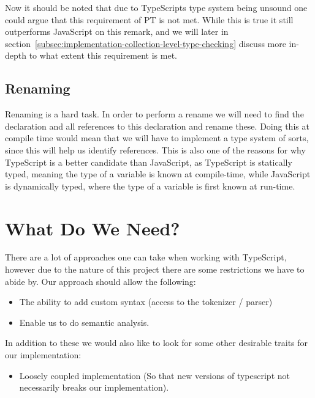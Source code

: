 Now it should be noted that due to TypeScripts type system being unsound one could argue that this requirement of PT is not met.
While this is true it still outperforms JavaScript on this remark, and we will later in section~\vref{subsec:implementation-collection-level-type-checking} discuss more in-depth to what extent this requirement is met.

\subsection{Renaming}\label{subsec:ts-vs-js-renaming}

Renaming is a hard task.
In order to perform a rename we will need to find the declaration and all references to this declaration and rename these.
Doing this at compile time would mean that we will have to implement a type system of sorts, since this will help us identify references.
This is also one of the reasons for why TypeScript is a better candidate than JavaScript, as TypeScript is statically typed, meaning the type of a variable is known at compile-time, while JavaScript is dynamically typed, where the type of a variable is first known at run-time.

\section{What Do We Need?}\label{sec:what-do-we-need}

There are a lot of approaches one can take when working with TypeScript, however due to the nature of this project there are some restrictions we have to abide by.
Our approach should allow the following:

\begin{itemize}
    \item The ability to add custom syntax (access to the tokenizer / parser)
    \item Enable us to do semantic analysis.
\end{itemize}

In addition to these we would also like to look for some other desirable traits for our implementation:

\begin{itemize}
    \item Loosely coupled implementation (So that new versions of typescript not necessarily breaks our implementation).
\end{itemize}


